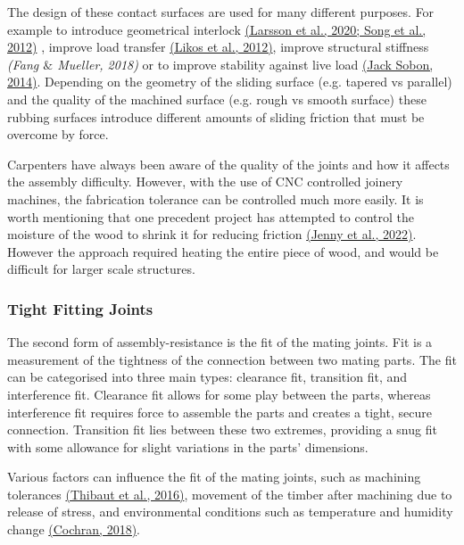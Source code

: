 \documentclass[11pt]{book}
\begin{document}
\vspace{1\baselineskip}
The design of these contact surfaces are used for many different purposes. For example to introduce geometrical interlock \href{https://www.zotero.org/google-docs/?FoyCyy}{(Larsson et al., 2020; Song et al., 2012)}\textit{ }, improve load transfer \href{https://www.zotero.org/google-docs/?uGwPtv}{(Likos et al., 2012)}, improve structural stiffness\textit{ \href{https://www.zotero.org/google-docs/?vLOXsl}{}(Fang $\&$ Mueller, 2018)} or to improve stability against live load \href{https://www.zotero.org/google-docs/?PPcjqg}{(Jack Sobon, 2014)}. Depending on the geometry of the sliding surface (e.g. tapered vs parallel) and the quality of the machined surface (e.g. rough vs smooth surface) these rubbing surfaces introduce different amounts of sliding friction that must be overcome by force.

Carpenters have always been aware of the quality of the joints and how it affects the assembly difficulty. However, with the use of CNC controlled joinery machines, the fabrication tolerance can be controlled much more easily. It is worth mentioning that one precedent project has attempted to control the moisture of the wood to shrink it for reducing friction \href{https://www.zotero.org/google-docs/?Wr3WNi}{(Jenny et al., 2022)}. However the approach required heating the entire piece of wood, and would be difficult for larger scale structures.

\subsubsection{Tight Fitting Joints}

The second form of assembly-resistance is the fit of the mating joints. Fit is a measurement of the tightness of the connection between two mating parts. The fit can be categorised into three main types: clearance fit, transition fit, and interference fit. Clearance fit allows for some play between the parts, whereas interference fit requires force to assemble the parts and creates a tight, secure connection. Transition fit lies between these two extremes, providing a snug fit with some allowance for slight variations in the parts' dimensions.

Various factors can influence the fit of the mating joints, such as machining tolerances \href{https://www.zotero.org/google-docs/?FYX9pE}{(Thibaut et al., 2016)}, movement of the timber after machining due to release of stress, and environmental conditions such as temperature and humidity change \href{https://www.zotero.org/google-docs/?2HzXKN}{(Cochran, 2018)}. 
\end{document}
